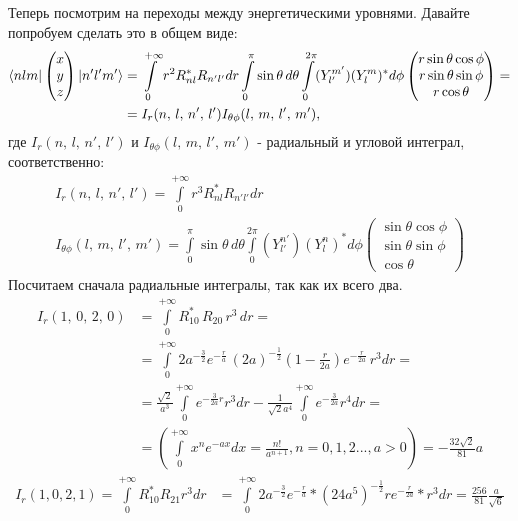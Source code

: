 Теперь посмотрим на переходы между энергетическими уровнями. Давайте попробуем сделать это в общем виде:
\begin{align*}
    \bra{nlm}\begin{pmatrix} x \\ y \\ z \end{pmatrix}\ket{n'l'm'} &= \int\limits_{0}^{+\infty} r^2 R^*_{nl} R_{n'l'} dr \int\limits_{0}^{\pi}\sin\theta\,d\theta\int\limits_{0}^{2\pi}(Y^{m'}_{l'}) (Y^m_l)^*d\phi \begin{pmatrix} r\sin\theta\cos\phi \\ r\sin\theta\sin\phi \\ r\cos\theta \end{pmatrix} = \\ & = I_r(n,\,l,\,n',\,l')I_{\theta\phi}(l,\,m,\,l',\,m'),
\end{align*}
где $I_r(n,\,l,\,n',\,l')$ и $I_{\theta\phi}(l,\,m,\,l',\,m')$ - радиальный и угловой интеграл, соответственно:
\begin{gather*}
I_r(n,\,l,\,n',\,l') = \int\limits_{0}^{+\infty} r^3 R^*_{nl} R_{n'l'} dr\\
I_{\theta\phi}(l,\,m,\,l',\,m') = \int\limits_{0}^{\pi}\sin\theta\,d\theta\int\limits_{0}^{2\pi}(Y^{n'}_{l'}) (Y^n_l)^*d\phi \begin{pmatrix} \sin\theta\cos\phi \\ \sin\theta\sin\phi \\ \cos\theta \end{pmatrix}
\end{gather*}
Посчитаем сначала радиальные интегралы, так как их всего два.
\begin{align*}
    I_r(1,\,0,\,2,\,0) &= \int\limits_{0}^{+\infty} R_{10}^*\,R_{20}\,r^3\,dr =\\
    &= \int\limits_{0}^{+\infty} 2a^{-\frac{3}{2}} e^{-\frac{r}{a}} \, (2a)^{-\frac{1}{2}} (1 - \frac{r}{2a}) e^{-\frac{r}{2a}} \, r^3 dr = \\
    & = \frac{\sqrt{2}}{a^3} \int\limits_{0}^{+\infty} e^{-\frac{3}{2a}r} r^3 dr - \frac{1}{\sqrt{2}a^4} \int\limits_{0}^{+\infty} e^{-\frac{3}{2a}} r^4 dr = \\
    & = \left(\int\limits_{0}^{+\infty} x^n e^{-ax} dx = \frac{n!}{a^{n + 1}}, n = 0, 1, 2..., a > 0\right) = -\frac{32\sqrt{2}}{81} a
\end{align*}
\begin{align*}
    I_r(1, 0, 2, 1) = \int\limits_{0}^{+\infty} R_{10}^* R_{21} r^3 dr &= \int\limits_{0}^{+\infty} 2a^{-\frac{3}{2}} e^{-\frac{r}{a}} * (24a^5)^{-\frac{1}{2}} r e^{-\frac{r}{2a}} * r^3 dr = \frac{256}{81} \frac{a}{\sqrt{6}} 
\end{align*}
